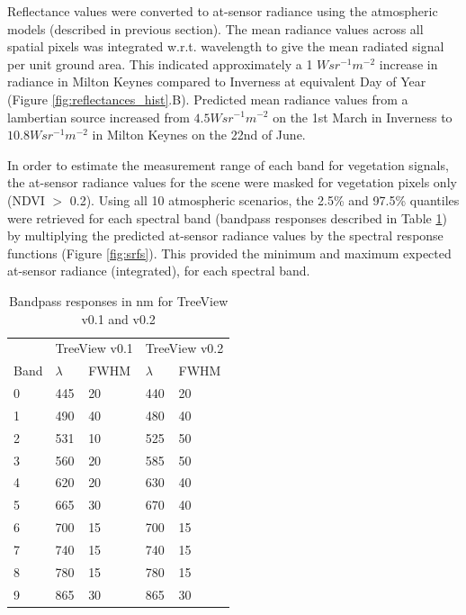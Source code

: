 \documentclass[10pt,a4paper,final,onecolumn]{article}
\begin{document}
Reflectance values were converted to at-sensor radiance using the atmospheric models (described in previous section). The mean radiance values across all spatial pixels was integrated w.r.t. wavelength to give the mean radiated signal per unit ground area. This indicated approximately a 1 $W sr^{-1} m^{-2}$ increase in radiance in Milton Keynes compared to Inverness at equivalent Day of Year (Figure \ref{fig:reflectances_hist}.B). Predicted mean radiance values from a lambertian source increased from $4.5 W sr^{-1} m^{-2}$ on the 1st March in Inverness to $10.8 W sr^{-1} m^{-2}$ in Milton Keynes on the 22nd of June.

In order to estimate the measurement range of each band for vegetation signals, the at-sensor radiance values for the scene were masked for vegetation pixels only (NDVI $>$ 0.2). Using all 10 atmospheric scenarios, the 2.5\% and 97.5\% quantiles were retrieved for each spectral band (bandpass responses described in Table \ref{tab:bandpass}) by multiplying the predicted at-sensor radiance values by the spectral response functions (Figure \ref{fig:srfs}). This provided the minimum and maximum expected at-sensor radiance (integrated), for each spectral band.
\begin{table}
\centering
\begin{tabular}{lllll}
\toprule
     & \multicolumn{2}{l}{TreeView v0.1} & \multicolumn{2}{l}{TreeView v0.2} \\
Band & $\lambda$          & FWHM         & $\lambda$          & FWHM         \\
\midrule
0    & 445                & 20           & 440                & 20           \\
1    & 490                & 40           & 480                & 40           \\
2    & 531                & 10           & 525                & 50           \\
3    & 560                & 20           & 585                & 50           \\
4    & 620                & 20           & 630                & 40           \\
5    & 665                & 30           & 670                & 40           \\
6    & 700                & 15           & 700                & 15           \\
7    & 740                & 15           & 740                & 15           \\
8    & 780                & 15           & 780                & 15           \\
9    & 865                & 30           & 865                & 30          \\
\bottomrule
\end{tabular}
    \caption{Bandpass responses in nm for TreeView v0.1 and v0.2}
    \label{tab:bandpass}
\end{table}
\end{document}
